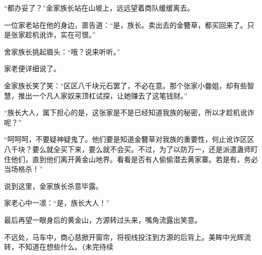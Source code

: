 \begin{this_body}
“都办妥了？”金家族长站在山坡上，远远望着商队缓缓离去。

一位家老站在他的身边，禀告道：“是，族长。卖出去的金簪草，都买回来了。只是张家趁机讹诈，实在可恨。”

舍家族长挑起眉头：“哦？说来听听。”

家老便详细说了。

金家族长笑了笑：“区区八千块元石罢了，不必在意。那个张家小齤姐，却有些智慧，推出一个凡人家奴来顶杠试探，让她赚去了这笔钱财。”

“族长大人，属下担心的是，这张家是不是已经知道我族的秘密，所以才趁机讹诈呢？”

“呵呵呵，不要疑神疑鬼了。他们要是知道金簪草对我族的重要性，何止讹诈区区八千块？要么就全买下来，要么就不会买。不过，为了以防万一，还是派遣蛊师盯住他们，直到他们离开黄金山地界。看看是否有人偷偷潜去黄家寨。若是有，务必当场格杀！”

说到这里，金家族长杀意毕露。

家老心中一凛：“是，族长大人！”

最后再望一眼身后的黄金山，方源转过头来，嘴角流露出笑意。

不远处，马车中，商心慈掀开窗帘，将视线投注到方源的后背上。美眸中光辉流转，不知道在想些什么。（未完待续

\end{this_body}

